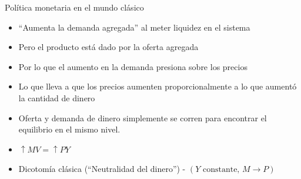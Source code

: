 \documentclass{beamer}
\begin{document}
\begin{frame}{Política monetaria en el mundo clásico}
\begin{itemize}
    \item “Aumenta la demanda agregada” al meter liquidez en el sistema 
    \item Pero el producto está dado por la oferta agregada
    \item Por lo que el aumento en la demanda presiona sobre los precios
    \item Lo que lleva a que los precios aumenten proporcionalmente a lo que aumentó la cantidad de dinero
    \item Oferta y demanda de dinero simplemente se corren para encontrar el equilibrio en el mismo nivel.
    \item $\uparrow M V=\uparrow P Y$ 
    \item Dicotomía clásica (“Neutralidad del dinero”) - $(Y \text{ constante, } M \rightarrow P)$
    \end{itemize}
\end{frame}
\end{document}

